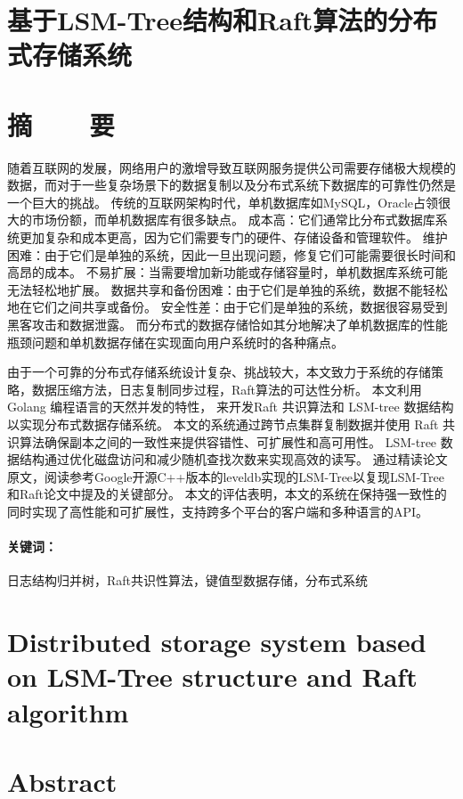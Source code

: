 \section*{基于LSM-Tree结构和Raft算法的分布式存储系统}
\section*{摘\ \ \ \ 要}

随着互联网的发展，网络用户的激增导致互联网服务提供公司需要存储极大规模的数据，而对于一些复杂场景下的数据复制以及分布式系统下数据库的可靠性仍然是一个巨大的挑战。
传统的互联网架构时代，单机数据库如MySQL，Oracle占领很大的市场份额，而单机数据库有很多缺点。
成本高：它们通常比分布式数据库系统更加复杂和成本更高，因为它们需要专门的硬件、存储设备和管理软件。
维护困难：由于它们是单独的系统，因此一旦出现问题，修复它们可能需要很长时间和高昂的成本。
不易扩展：当需要增加新功能或存储容量时，单机数据库系统可能无法轻松地扩展。
数据共享和备份困难：由于它们是单独的系统，数据不能轻松地在它们之间共享或备份。
安全性差：由于它们是单独的系统，数据很容易受到黑客攻击和数据泄露。
而分布式的数据存储恰如其分地解决了单机数据库的性能瓶颈问题和单机数据存储在实现面向用户系统时的各种痛点。


由于一个可靠的分布式存储系统设计复杂、挑战较大，本文致力于系统的存储策略，数据压缩方法，日志复制同步过程，Raft算法的可达性分析。
本文利用 Golang 编程语言的天然并发的特性， 来开发Raft 共识算法和 LSM-tree 数据结构以实现分布式数据存储系统。 
本文的系统通过跨节点集群复制数据并使用 Raft 共识算法确保副本之间的一致性来提供容错性、可扩展性和高可用性。 
LSM-tree 数据结构通过优化磁盘访问和减少随机查找次数来实现高效的读写。 
通过精读论文原文，阅读参考Google开源C++版本的leveldb实现的LSM-Tree以复现LSM-Tree和Raft论文中提及的关键部分。
本文的评估表明，本文的系统在保持强一致性的同时实现了高性能和可扩展性，支持跨多个平台的客户端和多种语言的API。

\paragraph{关键词：} 日志结构归并树，Raft共识性算法，键值型数据存储，分布式系统

\clearpage


\section*{Distributed storage system based on LSM-Tree structure and Raft algorithm}

\section*{Abstract}

